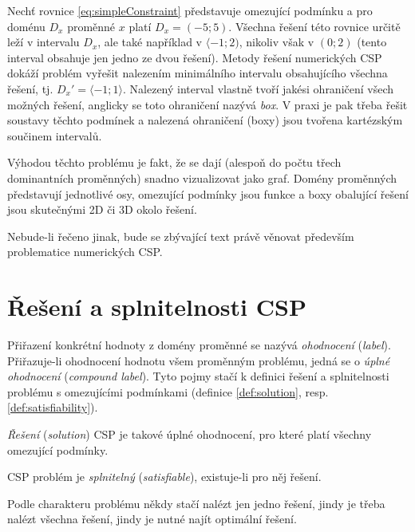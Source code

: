 Nechť rovnice \ref{eq:simpleConstraint} představuje omezující podmínku a pro doménu $D_x$ proměnné $x$ platí $D_x = (-5;5)$. Všechna řešení této rovnice určitě leží v intervalu $D_x$, ale také například v $\langle -1;2)$, nikoliv však v $(0;2)$ (tento interval obsahuje jen jedno ze dvou řešení). Metody řešení numerických CSP dokáží problém vyřešit nalezením minimálního intervalu obsahujícího všechna řešení, tj. $D_x' = \langle -1;1\rangle$. Nalezený interval vlastně tvoří jakési ohraničení všech možných řešení, anglicky se toto ohraničení nazývá \emph{box}. V praxi je pak třeba řešit soustavy těchto podmínek a nalezená ohraničení (boxy) jsou tvořena kartézským součinem intervalů.

Výhodou těchto problému je fakt, že se dají (alespoň do počtu třech dominantních proměnných) snadno vizualizovat jako graf. Domény proměnných představují jednotlivé osy, omezující podmínky jsou funkce a boxy obalující řešení jsou skutečnými 2D či 3D  okolo řešení.

Nebude-li řečeno jinak, bude se zbývající text právě věnovat především problematice numerických CSP.





\section{Řešení a splnitelnosti CSP}
Přiřazení konkrétní hodnoty z domény proměnné se nazývá \emph{ohodnocení} (\emph{label}). Přiřazuje-li ohodnocení hodnotu všem proměnným problému, jedná se o \emph{úplné ohodnocení} (\emph{compound label}). Tyto pojmy stačí k definici řešení a splnitelnosti problému s omezujícími podmínkami (definice \ref{def:solution}, resp. \ref{def:satisfiability}).

\begin{definition}
\label{def:solution}
\emph{Řešení} (\emph{solution}) CSP je takové úplné ohodnocení, pro které platí všechny omezující podmínky.
\end{definition}

\begin{definition}
\label{def:satisfiability}
CSP problém je \emph{splnitelný} (\emph{satisfiable}), existuje-li pro něj řešení.
\end{definition}

Podle charakteru problému někdy stačí nalézt jen jedno řešení, jindy je třeba nalézt všechna řešení, jindy je nutné najít optimální řešení.

